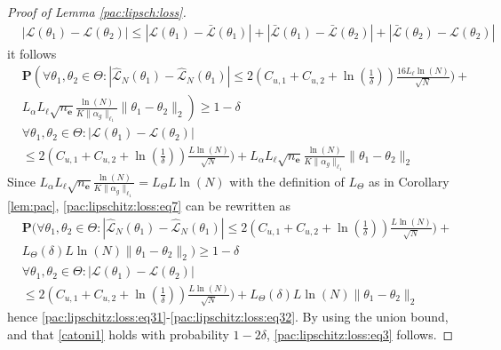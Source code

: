 \documentclass{article}
\newcommand{\e}{\mathbf{e}}
\newcommand{\bP}{\mathbf{P}}
\begin{document}
\begin{proof}[Proof of Lemma \ref{pac:lipsch:loss}]
\begin{align*}
       & |\mathcal{L}(\theta_1)-\mathcal{L}(\theta_2)| \le |\mathcal{L}(\theta_1)-\bar{\mathcal{L}}(\theta_1)| + |\bar{\mathcal{L}}(\theta_1)-\bar{\mathcal{L}}(\theta_2)| + |\bar{\mathcal{L}}(\theta_2)-\mathcal{L}(\theta_2)|
     \end{align*}
     it follows
     \begin{equation}
    \label{pac:lipschitz:loss:eq7}
      \begin{aligned}
      & \bP\left(\forall \theta_1, \theta_2 \in \Theta: \left|\hat{\mathcal{L}}_N(\theta_1) - \hat{\mathcal{L}}_N(\theta_1)\right| \le 2(C_{u,1}+C_{u,2}+\ln(\frac{1}{\delta})) \frac{16 L_{\ell}\ln(N)}{\sqrt{N}}) + \right. \\
      & \left. L_{\alpha}L_{\ell}\sqrt{n_\e}\frac{\ln(N)}{K\|\alpha_g\|_{\ell_1}} \|\theta_1 - \theta_2\|_2 \right) \ge 1-\delta \\
      & \forall \theta_1, \theta_2 \in \Theta:  \left|\mathcal{L}(\theta_1) - \mathcal{L}(\theta_2)\right| \\
      & \le  2(C_{u,1}+C_{u,2}+\ln(\frac{1}{\delta})) \frac{L \ln(N)}{\sqrt{N}}) +L_{\alpha}L_{\ell}\sqrt{n_\e}\frac{\ln(N)}{K\|\alpha_g\|_{\ell_1}} \|\theta_1 - \theta_2\|_2
      \end{aligned}
    \end{equation}
    Since $L_{\alpha}L_{\ell}\sqrt{n_\e}\frac{\ln(N)}{K\|\alpha_g\|_{\ell_1}}=L_{\Theta}L\ln(N)$ with the definition of $L_{\Theta}$
    as in Corollary \ref{lem:pac}, \eqref{pac:lipschitz:loss:eq7} can be rewritten as
\begin{equation}
    \label{pac:lipschitz:loss:eq8}
      \begin{aligned}
      & \bP\big(\forall \theta_1, \theta_2 \in \Theta: \left|\hat{\mathcal{L}}_N(\theta_1) - \hat{\mathcal{L}}_N(\theta_1)\right| \le 2(C_{u,1}+C_{u,2}+\ln(\frac{1}{\delta})) \frac{L\ln(N)}{\sqrt{N}}) +  \\
      & L_{\Theta}(\delta) L\ln(N)\|\theta_1 - \theta_2\|_2\big) \ge 1-\delta \\
      & \forall \theta_1, \theta_2 \in \Theta:  \left|\mathcal{L}(\theta_1) - \mathcal{L}(\theta_2)\right|  \\
      & \le  2(C_{u,1}+C_{u,2}+\ln(\frac{1}{\delta})) \frac{L\ln(N)}{\sqrt{N}}) +L_{\Theta}(\delta)L\ln(N) \|\theta_1 - \theta_2\|_2
      \end{aligned}
    \end{equation}
    hence \eqref{pac:lipschitz:loss:eq31}-\eqref{pac:lipschitz:loss:eq32}. 
    By using the union bound, 
    and that \eqref{catoni1} holds with probability $1-2\delta$, 
    \eqref{pac:lipschitz:loss:eq3} follows. 


\end{proof}
\end{document}
